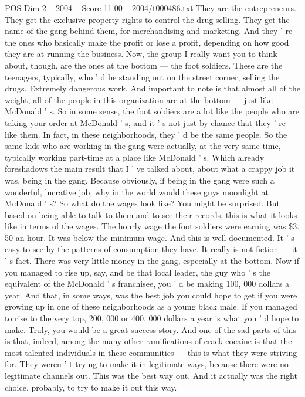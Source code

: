 \begin{textsample}{POS Dim 2 – 2004 – Score 11.00 – 2004/t000486.txt}
They are the entrepreneurs.
They get the exclusive property rights to control the drug-selling.
They get the name of the gang behind them, for merchandising and marketing.
And they ' re the ones who basically make the profit or lose a profit, depending on how good they are at running the business.
Now, the group I really want you to think about, though, are the ones at the bottom — the foot soldiers.
These are the teenagers, typically, who ' d be standing out on the street corner, selling the drugs.
Extremely dangerous work.
And important to note is that almost all of the weight, all of the people in this organization are at the bottom — just like McDonald ' s.
So in some sense, the foot soldiers are a lot like the people who are taking your order at McDonald ' s, and it ' s not just by chance that they ' re like them.
In fact, in these neighborhoods, they ' d be the same people.
So the same kids who are working in the gang were actually, at the very same time, typically working part-time at a place like McDonald ' s.
Which already foreshadows the main result that I ' ve talked about, about what a crappy job it was, being in the gang.
Because obviously, if being in the gang were such a wonderful, lucrative job, why in the world would these guys moonlight at McDonald ' s?
So what do the wages look like?
You might be surprised.
But based on being able to talk to them and to see their records, this is what it looks like in terms of the wages.
The hourly wage the foot soldiers were earning was \$3. 50 an hour.
It was below the minimum wage.
And this is well-documented.
It ' s easy to see by the patterns of consumption they have.
It really is not fiction — it ' s fact.
There was very little money in the gang, especially at the bottom.
Now if you managed to rise up, say, and be that local leader, the guy who ' s the equivalent of the McDonald ' s franchisee, you ' d be making 100, 000 dollars a year.
And that, in some ways, was the best job you could hope to get if you were growing up in one of these neighborhoods as a young black male.
If you managed to rise to the very top, 200, 000 or 400, 000 dollars a year is what you ' d hope to make.
Truly, you would be a great success story.
And one of the sad parts of this is that, indeed, among the many other ramifications of crack cocaine is that the most talented individuals in these communities — this is what they were striving for.
They weren ' t trying to make it in legitimate ways, because there were no legitimate channels out.
This was the best way out.
And it actually was the right choice, probably, to try to make it out this way.

\end{textsample}
